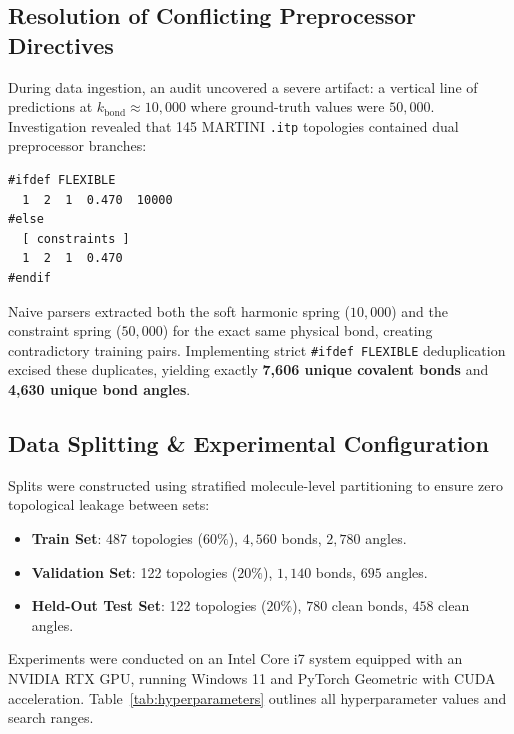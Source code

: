 \documentclass[11pt,a4paper]{article}
\begin{document}
\subsection{Resolution of Conflicting Preprocessor Directives}
During data ingestion, an audit uncovered a severe artifact: a vertical line of predictions at $k_{\text{bond}} \approx 10{,}000$ where ground-truth values were $50{,}000$. Investigation revealed that 145 MARTINI \texttt{.itp} topologies contained dual preprocessor branches:
\begin{verbatim}
#ifdef FLEXIBLE
  1  2  1  0.470  10000
#else
  [ constraints ]
  1  2  1  0.470
#endif
\end{verbatim}
Naive parsers extracted both the soft harmonic spring ($10{,}000$) and the constraint spring ($50{,}000$) for the exact same physical bond, creating contradictory training pairs. Implementing strict \texttt{\#ifdef FLEXIBLE} deduplication excised these duplicates, yielding exactly \textbf{7,606 unique covalent bonds} and \textbf{4,630 unique bond angles}.

\subsection{Data Splitting \& Experimental Configuration}
Splits were constructed using stratified molecule-level partitioning to ensure zero topological leakage between sets:
\begin{itemize}
    \item \textbf{Train Set}: 487 topologies ($60\%$), $4{,}560$ bonds, $2{,}780$ angles.
    \item \textbf{Validation Set}: 122 topologies ($20\%$), $1{,}140$ bonds, $695$ angles.
    \item \textbf{Held-Out Test Set}: 122 topologies ($20\%$), $780$ clean bonds, $458$ clean angles.
\end{itemize}

Experiments were conducted on an Intel Core i7 system equipped with an NVIDIA RTX GPU, running Windows 11 and PyTorch Geometric with CUDA acceleration. Table~\ref{tab:hyperparameters} outlines all hyperparameter values and search ranges.
\end{document}

